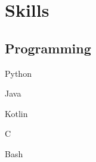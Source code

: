 \documentclass[]{abhijeet_viswa-deedy-resume-openfont}
\begin{document}
\begin{minipage}[t]{0.25\textwidth}
%


\section{Skills}
\subsection{Programming}
\begin{itemize*}
 \item Python
 \item Java
 \item Kotlin
 \item C
 \item Bash
\end{itemize*}
\subsectionsep


\end{minipage}
\end{document}
